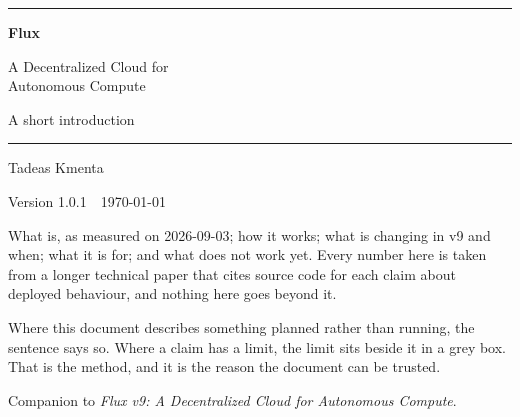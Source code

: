 \begin{titlepage}
\thispagestyle{empty}
\centering
\vspace*{0.17\textheight}

{\color{FluxRule}\rule{\linewidth}{1.4pt}}\par\vspace{1.5em}
{\Huge\bfseries\color{FluxBlue} Flux\par}
\vspace{0.6em}
{\LARGE A Decentralized Cloud for\\[0.3em] Autonomous Compute\par}
\vspace{0.9em}
{\large\color{FluxSlate} A short introduction\par}
\vspace{1.5em}
{\color{FluxRule}\rule{\linewidth}{1.4pt}}\par

\vspace{2.2em}
{\large Tadeas Kmenta\par}
\vspace{0.45em}
{\color{FluxSlate}Version 1.0.1\ \textperiodcentered\ \today\par}

\vspace{3em}
\begin{minipage}{0.88\linewidth}
\small\color{FluxSlate}\setlength{\parskip}{0.75em}
\setlength{\emergencystretch}{2em}
What \Flux{} is, as measured on 2026-09-03; how it works; what is changing in v9 and when; what it
is for; and what does not work yet. Every number here is taken from a longer technical paper that
cites source code for each claim about deployed behaviour, and nothing here goes beyond it.

Where this document describes something planned rather than running, the sentence says so.
Where a claim has a limit, the limit sits beside it in a grey box. That is the method, and it is
the reason the document can be trusted.
\end{minipage}

\vfill
{\footnotesize\color{FluxSlate}
Companion to \emph{Flux v9: A Decentralized Cloud for Autonomous Compute}.\par}
\vspace{1.2em}
\end{titlepage}

\clearpage
\thispagestyle{empty}
